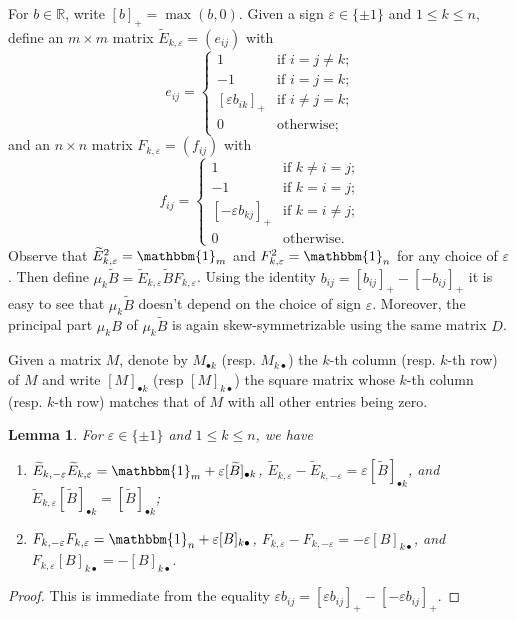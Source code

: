 \documentclass{amsart}
\newtheorem{lemma}[theorem]{Lemma}
\numberwithin{theorem}{section}
\newcommand{\bfb}{\boldsymbol{b}}
\newcommand{\RR}{\mathbb{R}}
\newcommand{\bOne}{\mathbbm{1}}
\begin{document}
  For $b\in\RR$, write $[b]_+=\max(b,0)$.
  Given a sign $\varepsilon\in\{\pm1\}$ and $1\le k\le n$, define an $m\times m$ matrix $\widetilde E_{k,\varepsilon}=(e_{ij})$ with
  \begin{equation}
    \label{eq:left mutation matrix}
    e_{ij}=\begin{cases} 1 & \text{if $i=j\ne k$;}\\ -1 & \text{if $i=j=k$;}\\ [\varepsilon b_{ik}]_+ & \text{if $i\ne j=k$;}\\ 0 & \text{otherwise;} \end{cases}
  \end{equation}
  and an $n\times n$ matrix $F_{k,\varepsilon}=(f_{ij})$ with
  \begin{equation}
    \label{eq:right mutation matrix}
    f_{ij}=\begin{cases} 1 & \text{if $k\ne i=j$;}\\ -1 & \text{if $k=i=j$;}\\ [-\varepsilon b_{kj}]_+ & \text{if $k=i\ne j$;}\\ 0 & \text{otherwise.} \end{cases}
  \end{equation}
  Observe that $\widetilde E^2_{k,\varepsilon}=\bOne_m$ and $F^2_{k,\varepsilon}=\bOne_n$ for any choice of $\varepsilon$.
  Then define $\mu_k\widetilde B=\widetilde E_{k,\varepsilon} \widetilde B F_{k,\varepsilon}$.
  Using the identity $b_{ij}=[b_{ij}]_+-[-b_{ij}]_+$ it is easy to see that $\mu_k\widetilde B$ doesn't depend on the choice of sign $\varepsilon$.
  Moreover, the principal part $\mu_k B$ of $\mu_k\widetilde B$ is again skew-symmetrizable using the same matrix $D$.

  Given a matrix $M$, denote by $M_{\bullet k}$ (resp. $M_{k \bullet}$) the $k$-th column (resp. $k$-th row) of $M$ and write $[M]_{\bullet k}$ (resp $[M]_{k\bullet}$)  the square matrix whose $k$-th column (resp. $k$-th row) matches that of $M$ with all other entries being zero.
  \begin{lemma}
    For $\varepsilon\in\{\pm1\}$ and $1\le k \le n$, we have 
    \begin{enumerate}
      \item $\widetilde E_{k,-\varepsilon} \widetilde E_{k,\varepsilon} = \bOne_m + \varepsilon [\widetilde B]_{\bullet k}$, $\widetilde E_{k,\varepsilon} - \widetilde E_{k,-\varepsilon} = \varepsilon [\widetilde B]_{\bullet k}$, and $\widetilde E_{k,\varepsilon} [\widetilde B]_{\bullet k} = [\widetilde B]_{\bullet k}$;
      \item $F_{k,-\varepsilon} F_{k,\varepsilon} = \bOne_n + \varepsilon [B]_{k \bullet}$, $F_{k,\varepsilon} - F_{k,-\varepsilon} = -\varepsilon [B]_{k \bullet}$, and $F_{k,\varepsilon} [B]_{k \bullet} = -[B]_{k \bullet}$.
    \end{enumerate}
  \end{lemma}
  \begin{proof}
    This is immediate from the equality $\varepsilon b_{ij}=[\varepsilon b_{ij}]_+-[-\varepsilon b_{ij}]_+$.
  \end{proof}
\end{document}
